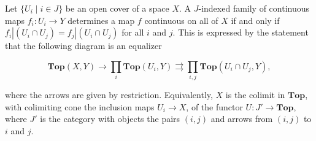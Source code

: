 Let $\{U_i \mid i \in J\}$ be an open cover of a space $X$. A $J$-indexed family of continuous maps $f_i: U_i \to Y$ determines a map $f$ continuous on all of $X$ if and only if $f_i | (U_i \cap U_j) = f_j | (U_i \cap U_j)$ for all $i$ and $j$. This is expressed by the statement that the following diagram is an equalizer

$$\mathbf{Top}(X, Y) \to \prod_i \mathbf{Top}(U_i, Y) \rightrightarrows \prod_{i,j} \mathbf{Top}(U_i \cap U_j, Y),$$

where the arrows are given by restriction. Equivalently, $X$ is the colimit in $\mathbf{Top}$, with colimiting cone the inclusion maps $U_i \to X$, of the functor $U: J' \to \mathbf{Top}$, where $J'$ is the category with objects the pairs $(i, j)$ and arrows from $(i, j)$ to $i$ and $j$.
